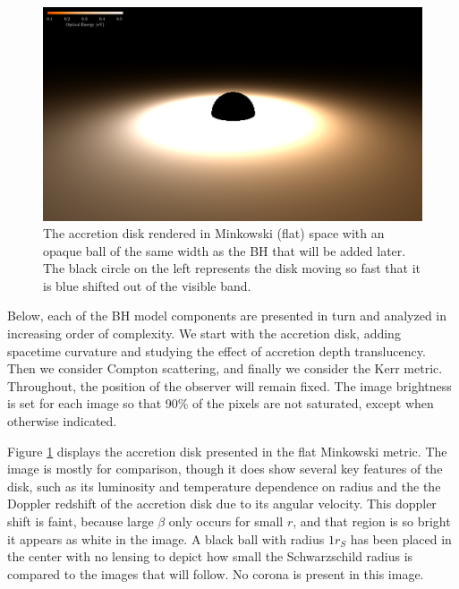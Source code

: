 \documentclass[twocolumn,twocolappendix]{aastex631}
\begin{document}
\begin{figure}[htbp!]
  \centering
  \includegraphics[width=\linewidth]{../data/minkowski-optical.pdf}
  \caption{The accretion disk rendered in Minkowski (flat) space with an opaque ball of the same width as the BH that will be added later. The black circle on the left represents the disk moving so fast that it is blue shifted out of the visible band.}
  \label{fig:mink}
\end{figure}

Below, each of the BH model components are presented in turn and analyzed in increasing order of complexity. We start with the accretion disk, adding spacetime curvature and studying the effect of accretion depth translucency. Then we consider Compton scattering, and finally we consider the Kerr metric. Throughout, the position of the observer will remain fixed. The image brightness is set for each image so that 90\% of the pixels are not saturated, except when otherwise indicated.

Figure \ref{fig:mink} displays the accretion disk presented in the flat Minkowski metric. The image is mostly for comparison, though it does show several key features of the disk, such as its luminosity and temperature dependence on radius and the the Doppler redshift of the accretion disk due to its angular velocity. This doppler shift is faint, because large $\beta$ only occurs for small $r$, and that region is so bright it appears as white in the image. A black ball with radius $1 r_S$ has been placed in the center with no lensing to depict how small the Schwarzschild radius is compared to the images that will follow. No corona is present in this image.
\end{document}
